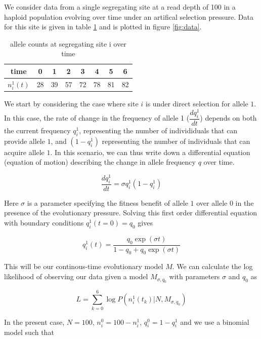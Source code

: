\documentclass{article}
\begin{document}
We consider data from a single segregating site at a read depth of 100  in a haploid population evolving over time under an artifical selection pressure. Data for this site is given in table \ref{tab:inf} and is plotted in figure \ref{fig:data}.

\begin{table}[h]
\centering
\begin{tabular}{ c|c c c c c c c}

 time & 0 & 1 & 2 & 3 & 4 & 5 & 6 \\
\hline
$n_i^1(t)$ & 28 & 39 & 57 & 72 & 78 & 81 & 82 \\

\end{tabular}
\caption{allele counts at segregating site i over time}
\label{tab:inf}
\end{table}

We start by considering the case where site $i$ is under direct selection for allele $1$. In this case, the rate of change in the frequency of allele 1 ($\dfrac{dq_i^1}{dt}$) depends on both the current frequency $q_i^1$, representing the number of individiduals that can provide allele $1$, and $(1-q_i^1)$ representing the number of individuals that can acquire allele $1$.
In this scenario, we can thus write down a differential equation (equation of motion) describing the change in allele frequency $q$ over time.

\begin{equation}
\dfrac{dq_i^1}{dt}=\sigma q_i^1 (1-q_i^1)
\end{equation}

Here $\sigma$ is a parameter specifying the fitness benefit of allele $1$ over allele $0$ in the presence of the evolutionary pressure.
Solving this first order differential equation with boundary conditions $q_i^1(t=0) = q_0$ gives

\begin{equation*}
q_i^1(t) = \dfrac{q_0 \exp{(\sigma t)}}{1-q_0+q_0 \exp{(\sigma t)}}
\end{equation*}

This will be our continous-time evolutionary model $M$. We can calculate the log likelihood of observing our data given a model $M_{\sigma,q_0}$ with parameters $\sigma$ and $q_0$ as 

\begin{equation*}
L = \sum_{k=0}^6{\log{P(n_i^1(t_k) | N, M_{\sigma,q_0})}}
\end{equation*}

In the present case, $N = 100$, $n_i^0 = 100 - n_i^1$, $q_i^0 = 1 - q_i^1$ and we use a binomial model such that
\end{document}
